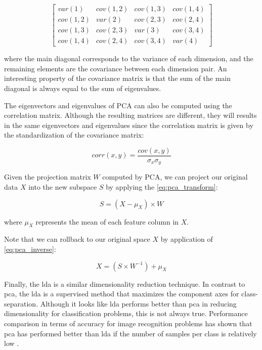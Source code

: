 $$
\begin{bmatrix}var(1) & cov(1,2) & cov(1,3) & cov(1,4) 
\\ cov(1,2) & var(2) & cov(2,3) & cov(2,4)
\\ cov(1,3) & cov(2,3) & var(3) & cov(3,4)
\\ cov(1,4) & cov(2,4) & cov(3,4) & var(4)
\end{bmatrix}
$$

\noindent
where the main diagonal corresponds to the variance of each dimension, and the remaining elements are the covariance between each dimension pair. An interesting property of the covariance matrix is that the sum of the main diagonal is always equal to the sum of eigenvalues.

The eigenvectors and eigenvalues of PCA can also be computed using the correlation matrix. Although the resulting matrices are different, they will results in the same eigenvectors and eigenvalues since the correlation matrix is given by the standardization of the covariance matrix:

\begin{equation}
\label{eq:correlation}
corr(x,y) = \frac{cov(x,y)}{\sigma_x \sigma_y}
\end{equation}

Given the projection matrix $W$ computed by PCA, we can project our original data $X$ into the new subspace $S$ by applying the \autoref{eq:pca_transform}:

\begin{equation}
\label{eq:pca_transform}
S = (X-\mu_X) \times W
\end{equation}

\noindent
where $\mu_X$ represents the mean of each feature column in $X$.

Note that we can rollback to our original space $X$ by application of \autoref{eq:pca_inverse}:

\begin{equation}
\label{eq:pca_inverse}
X = (S \times W^{-1}) + \mu_X
\end{equation}

Finally, the \acf{lda} \citep{izenman2013linear} is a similar dimensionality reduction technique. In contrast to \acs{pca}, the \acs{lda} is a supervised method that maximizes the component axes for class-separation. Although it looks like \acs{lda} performs better than \acs{pca} in reducing dimensionality for classification problems, this is not always true. Performance comparison in terms of accuracy for image recognition problems has shown that \acs{pca} has performed better than \acs{lda} if the number of samples per class is relatively low \citep{martinez2001pca}.


